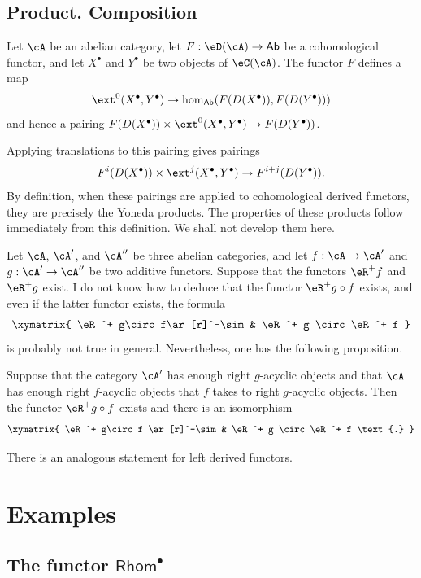 \subsection{Product. Composition}\label{VIII:4-3}

Let $\cA$ be an abelian category, let
$F:\eD(\cA) \to \mathsf{Ab}$ be a cohomological functor, and let
$X^\bullet$ and $Y^\bullet$ be two objects of $\eC(\cA)$. The functor $F$
defines a map
\[
  \ext^0(X^\bullet,Y^\bullet) \to \hom_{\mathsf{Ab}}(F(D(X^\bullet)),F(D(Y^\bullet)))
\]
and hence a pairing
$F(D(X^\bullet))\times \ext^0(X^\bullet,Y^\bullet) \to F(D(Y^\bullet))$.

Applying translations to this pairing gives pairings
\[
  F^i(D(X^\bullet))\times \ext^j(X^\bullet,Y^\bullet) \to F^{i+j}(D(Y^\bullet)) \text{.}
\]
By definition, when these pairings are applied to cohomological derived
functors, they are precisely the Yoneda products. The properties of these
products follow immediately from this definition. We shall not develop
them here.

Let $\cA$, $\cA'$, and $\cA''$ be three abelian categories, and let
$f:\cA\to \cA'$ and $g:\cA'\to \cA''$ be two additive functors. Suppose
that the functors $\eR^+ f$ and $\eR^+ g$ exist. I do not know how to
deduce that the functor $\eR^+ g\circ f$ exists, and even if the latter
functor exists, the formula
\[\xymatrix{
  \eR^+ g\circ f\ar[r]^-\sim
    & \eR^+ g \circ \eR^+ f
}\]
is probably not true in general. Nevertheless, one has the following
proposition.

\begin{proposition}\label{VIII:4-3-1}
Suppose that the category $\cA'$ has enough right $g$-acyclic objects and
that $\cA$ has enough right $f$-acyclic objects that $f$ takes to right
$g$-acyclic objects. Then the functor $\eR^+ g\circ f$ exists and there
is an isomorphism
\[\xymatrix{
  \eR^+ g\circ f \ar[r]^-\sim
    & \eR^+ g \circ \eR^+ f \text{.}
}\]
\end{proposition}

There is an analogous statement for left derived functors.

\section{Examples}\label{VIII:6} %

\subsection{The functor \texorpdfstring{$\mathsf{Rhom}^\bullet$}{Hom*}}\label{VIII:6-1}

